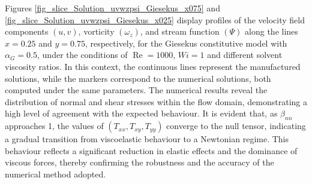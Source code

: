 \documentclass[preprint, 12pt]{elsarticle}
\begin{document}
Figures \ref{fig_slice_Solution_uvwzpsi_Giesekus_x075} and \ref{fig_slice_Solution_uvwzpsi_Giesekus_x025} display profiles of the velocity field components $(u, v)$, vorticity $(\omega_z)$, and stream function $(\Psi)$ along the lines $x=0.25$ and $y=0.75$, respectively, for the Giesekus constitutive model with $\alpha_G = 0.5$, under the conditions of $\operatorname{Re}=1000$, $Wi=1$ and different solvent viscosity ratios. In this context, the continuous lines represent the manufactured solutions, while the markers correspond to the numerical solutions, both computed under the same parameters. The numerical results reveal the distribution of normal and shear stresses within the flow domain, demonstrating a high level of agreement with the expected behaviour. It is evident that, as $\beta_{nn}$ approaches 1, the values of $(T_{xx}, T_{xy}, T_{yy})$ converge to the null tensor, indicating a gradual transition from viscoelastic behaviour to a Newtonian regime. This behaviour reflects a significant reduction in elastic effects and the dominance of viscous forces, thereby confirming the robustness and the accuracy of the numerical method adopted.
\end{document}
